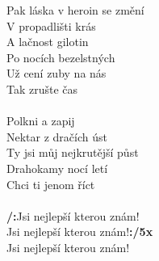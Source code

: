 \begin{multicols}{2}
Pak láska v heroin se změní\\
V propadlišti krás\\
A lačnost gilotin\\
Po nocích bezelstných\\
Už cení zuby na nás\\
Tak zrušte čas\\
\\
Polkni a zapij\\
Nektar z dračích úst\\
Ty jsi můj nejkrutější půst\\
Drahokamy nocí letí\\
Chci ti jenom říct\\
\\
\textbf{\slash :}Jsi nejlepší kterou znám!\\
Jsi nejlepší kterou znám!\textbf{:\slash\space 5x}\\
Jsi nejlepší kterou znám!
\end{multicols}